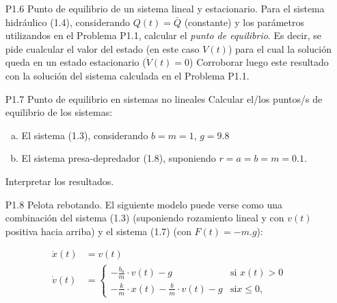\documentclass{article}
\begin{document}
\begin{itemize}
  \item[P1.6] Punto de equilibrio de un sistema lineal y estacionario. Para el sistema hidráulico (1.4), considerando $Q(t)=\bar{Q}$ (constante) y los parámetros utilizandos en el Problema P1.1, calcular el \textit{punto de equilibrio}. Es decir, se pide cualcular el valor del estado (en este caso $V(t)$) para el cual la solución queda en un estado estacionario ($\dot{V}(t)=0$)
Corroborar luego este resultado con la solución del sistema calculada en el Problema P1.1.

   \item[P1.7] Punto de equilibrio en sistemas no lineales Calcular el/los puntos/s de equilibrio de los sistemas:
	\begin{enumerate}[a)]
	\item El sistema (1.3), considerando $b=m=1$, $g=9.8$
	\item El sistema presa-depredador (1.8), suponiendo $r=a=b=m=0.1$. 
	\end{enumerate}

Interpretar los resultados.




   \item[P1.8] Pelota rebotando. El siguiente modelo puede verse como una combinación del sistema (1.3) (suponiendo rozamiento lineal y con $v(t)$ positiva hacia arriba) y el sistema (1.7) (con $F(t)=-m.g$):

\begin{align*}
  \dot{x}(t) &= v(t) \\
 \label{P1.8a} \tag{P1.8a}
  \dot{v}(t) &=   \begin{cases}
    -\frac{b_{a}}{m} \cdot v(t) - g & \text{si } x(t) > 0\\
    -\frac{k}{m} \cdot x(t) - \frac{b}{m} \cdot v(t) - g & \text {si} x \leq 0,
  \end{cases}\\
\end{align*}
\end{itemize}
\end{document}

